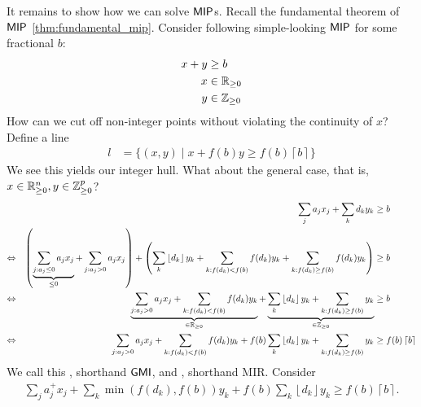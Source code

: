 It remains to show how we can solve $\mathsf{MIP}$s. Recall the fundamental theorem of $\mathsf{MIP}$ \autoref{thm:fundamental_mip}.
Consider following simple-looking $\mathsf{MIP}$ for some fractional $b$:
\begin{align*}
    x + y & \geq b                 \\
    x     & \in \mathbb{R}_{\geq 0}  \\
    y     & \in \mathbb{Z}_{\geq 0}
\end{align*}
How can we cut off non-integer points without violating the continuity of $x$?
Define a line
\begin{align*}
    l & = \{(x,y) \mid x + f(b)y \geq f(b)\left\lceil b \right\rceil \}
\end{align*}
We see this yields our integer hull.
What about the general case, that is, $x \in \mathbb{R}_{\geq 0}^n, y \in \mathbb{Z}_{\geq 0}^p$?
\begin{align*}
                    &  & \sum_j a_jx_j + \sum_k d_ky_k                                                                                                                                                                                                   & \geq b                               \\
    \Leftrightarrow &  & \left(\underbrace{\sum_{j:a_j \leq 0} a_jx_j}_{\leq 0} + \sum_{j:a_j > 0} a_jx_j\right) + \left( \sum_k \left\lfloor d_k \right\rfloor y_k + \sum_{k : f(d_k) < f(b)} f(d_k)y_k + \sum_{k : f(d_k) \geq f(b)} f(d_k)y_k \right) & \geq b                               \\
    \Leftrightarrow &  & \underbrace{\sum_{j:a_j > 0} a_jx_j + \sum_{k : f(d_k) < f(b)} f(d_k)y_k}_{\in \mathbb{R}_{\geq 0}} + \underbrace{\sum_k \left\lfloor d_k \right\rfloor y_k +  \sum_{k : f(d_k) \geq f(b)} y_k}_{\in \mathbb{Z}_{\geq 0}}          & \geq b                               \\
    \Leftrightarrow &  & \sum_{j:a_j > 0} a_jx_j + \sum_{k : f(d_k) < f(b)} f(d_k)y_k + f(b) \sum_k \left\lfloor d_k \right\rfloor y_k +  \sum_{k : f(d_k) \geq f(b)} y_k                                                                                & \geq f(b) \left\lceil b \right\rceil
\end{align*}
We call this , shorthand $\mathsf{GMI}$, and , shorthand MIR.
Consider
\begin{align*}
    \sum_j a_j^+x_j + \sum_k \min(f(d_k), f(b))y_k + f(b) \sum_k \left\lfloor d_k \right\rfloor y_k \geq f(b) \left\lceil b \right\rceil.
\end{align*}
